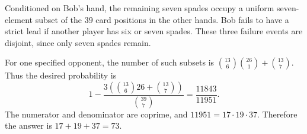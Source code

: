 Conditioned on Bob's hand, the remaining seven spades occupy a uniform seven-element subset of the $39$ card positions in the other hands. Bob fails to have a strict lead if another player has six or seven spades. These three failure events are disjoint, since only seven spades remain.

For one specified opponent, the number of such subsets is
$\binom{13}{6}\binom{26}{1}+\binom{13}{7}$. Thus the desired probability is
\[
1-\dfrac{3\left(\binom{13}{6}26+\binom{13}{7}\right)}{\binom{39}{7}}
=\dfrac{11843}{11951}.
\]
The numerator and denominator are coprime, and $11951=17\cdot19\cdot37$. Therefore the answer is $\boxed{17+19+37=73}$.
